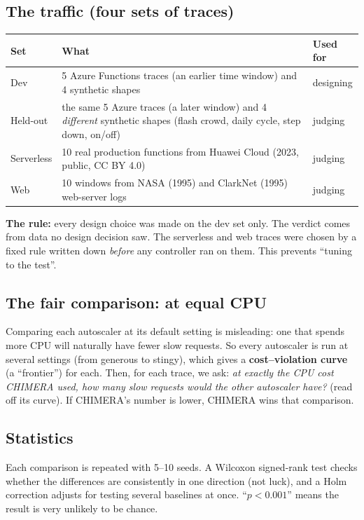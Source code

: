 \documentclass[11pt,a4paper]{article}
\begin{document}
\subsection{The traffic (four sets of traces)}
\begin{center}
\begin{tabular}{@{}lp{8.6cm}l@{}}
\toprule
\textbf{Set} & \textbf{What} & \textbf{Used for} \\
\midrule
Dev & 5 Azure Functions traces (an earlier time window) and 4 synthetic shapes & designing \\
Held-out & the same 5 Azure traces (a later window) and 4 \emph{different} synthetic shapes (flash crowd, daily cycle, step down, on/off) & judging \\
Serverless & 10 real production functions from Huawei Cloud (2023, public, CC BY 4.0) & judging \\
Web & 10 windows from NASA (1995) and ClarkNet (1995) web-server logs & judging \\
\bottomrule
\end{tabular}
\end{center}
\textbf{The rule:} every design choice was made on the dev set only. The verdict comes from
data no design decision saw. The serverless and web traces were chosen by a fixed rule
written down \emph{before} any controller ran on them. This prevents ``tuning to the
test''.

\subsection{The fair comparison: at equal CPU}
Comparing each autoscaler at its default setting is misleading: one that spends more CPU
will naturally have fewer slow requests. So every autoscaler is run at several settings
(from generous to stingy), which gives a \textbf{cost--violation curve} (a ``frontier'')
for each. Then, for each trace, we ask: \emph{at exactly the CPU cost CHIMERA used, how
many slow requests would the other autoscaler have?} (read off its curve). If CHIMERA's
number is lower, CHIMERA wins that comparison.

\subsection{Statistics}
Each comparison is repeated with 5--10 seeds. A Wilcoxon signed-rank test checks whether
the differences are consistently in one direction (not luck), and a Holm correction
adjusts for testing several baselines at once. ``$p<0.001$'' means the result is very
unlikely to be chance.
\end{document}
